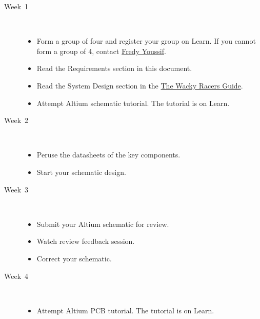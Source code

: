 \documentclass[11pt, a4paper]{article}
\makeatletter
\newcommand{\fredy}{\href{mailto:fredy.youssif@pg.canterbury.ac.nz}{Fredy Youssif}}
\newcommand{\theguide}{\href{https://eng-git.canterbury.ac.nz/wacky-racers/wacky-racers/-/blob/master/doc/guide/guide.pdf}{The Wacky Racers Guide}}
\makeatother
\begin{document}
\begin{description}
\item [Week~1]\mbox{}\\[-0.4cm]

  \begin{itemize}
  \item Form a group of four and register your group on Learn.  If you
    cannot form a group of 4, contact \fredy.

  \item Read the Requirements section in this document.

  \item Read the System Design section in the \theguide.

  \item Attempt Altium schematic tutorial.  The tutorial is on Learn.

  \end{itemize}

\item [Week~2]\mbox{}\\[-0.4cm]

  \begin{itemize}
  \item Peruse the datasheets of the key components.

  \item Start your schematic design.

  \end{itemize}

\item [Week~3]\mbox{}\\[-0.4cm]

  \begin{itemize}

  \item Submit your Altium schematic for review.

  \item Watch review feedback session.

  \item Correct your schematic.

  \end{itemize}

\item [Week~4]\mbox{}\\[-0.4cm]

  \begin{itemize}
  \item Attempt Altium PCB tutorial.  The tutorial is on Learn.


\end{itemize}
\end{description}
\end{document}
